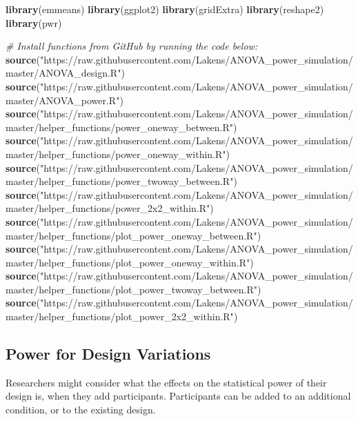 \documentclass[]{article}
\newenvironment{Shaded}{\begin{snugshade}}{\end{snugshade}}
\newcommand{\KeywordTok}[1]{\textcolor[rgb]{0.13,0.29,0.53}{\textbf{#1}}}
\newcommand{\StringTok}[1]{\textcolor[rgb]{0.31,0.60,0.02}{#1}}
\newcommand{\CommentTok}[1]{\textcolor[rgb]{0.56,0.35,0.01}{\textit{#1}}}
\newcommand{\NormalTok}[1]{#1}
\begin{document}
\begin{Shaded}
\begin{Highlighting}[]
\KeywordTok{library}\NormalTok{(emmeans)}
\KeywordTok{library}\NormalTok{(ggplot2)}
\KeywordTok{library}\NormalTok{(gridExtra)}
\KeywordTok{library}\NormalTok{(reshape2)}
\KeywordTok{library}\NormalTok{(pwr)}

\CommentTok{# Install functions from GitHub by running the code below:}
\KeywordTok{source}\NormalTok{(}\StringTok{"https://raw.githubusercontent.com/Lakens/ANOVA_power_simulation/master/ANOVA_design.R"}\NormalTok{)}
\KeywordTok{source}\NormalTok{(}\StringTok{"https://raw.githubusercontent.com/Lakens/ANOVA_power_simulation/master/ANOVA_power.R"}\NormalTok{)}
\KeywordTok{source}\NormalTok{(}\StringTok{"https://raw.githubusercontent.com/Lakens/ANOVA_power_simulation/master/helper_functions/power_oneway_between.R"}\NormalTok{)}
\KeywordTok{source}\NormalTok{(}\StringTok{"https://raw.githubusercontent.com/Lakens/ANOVA_power_simulation/master/helper_functions/power_oneway_within.R"}\NormalTok{)}
\KeywordTok{source}\NormalTok{(}\StringTok{"https://raw.githubusercontent.com/Lakens/ANOVA_power_simulation/master/helper_functions/power_twoway_between.R"}\NormalTok{)}
\KeywordTok{source}\NormalTok{(}\StringTok{"https://raw.githubusercontent.com/Lakens/ANOVA_power_simulation/master/helper_functions/power_2x2_within.R"}\NormalTok{)}
\KeywordTok{source}\NormalTok{(}\StringTok{"https://raw.githubusercontent.com/Lakens/ANOVA_power_simulation/master/helper_functions/plot_power_oneway_between.R"}\NormalTok{)}
\KeywordTok{source}\NormalTok{(}\StringTok{"https://raw.githubusercontent.com/Lakens/ANOVA_power_simulation/master/helper_functions/plot_power_oneway_within.R"}\NormalTok{)}
\KeywordTok{source}\NormalTok{(}\StringTok{"https://raw.githubusercontent.com/Lakens/ANOVA_power_simulation/master/helper_functions/plot_power_twoway_between.R"}\NormalTok{)}
\KeywordTok{source}\NormalTok{(}\StringTok{"https://raw.githubusercontent.com/Lakens/ANOVA_power_simulation/master/helper_functions/plot_power_2x2_within.R"}\NormalTok{)}
\end{Highlighting}
\end{Shaded}

\subsection{Power for Design
Variations}\label{power-for-design-variations}

Researchers might consider what the effects on the statistical power of
their design is, when they add participants. Participants can be added
to an additional condition, or to the existing design.
\end{document}
